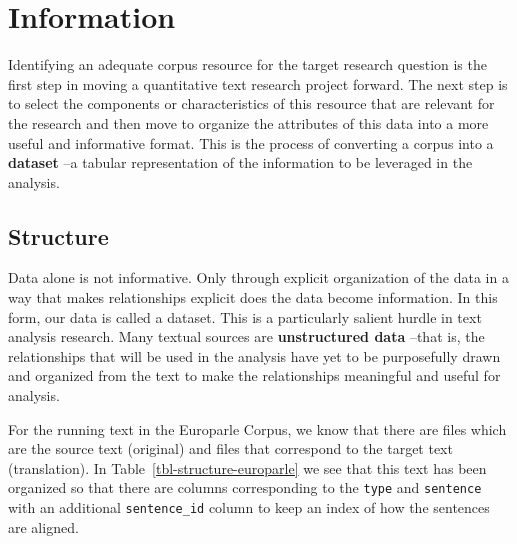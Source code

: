 \documentclass[
  letterpaper,
]{latex/krantz}
\begin{document}
\hypertarget{information}{%
\section{Information}\label{information}}

Identifying an adequate corpus resource for the target research question
is the first step in moving a quantitative text research project
forward. The next step is to select the components or characteristics of
this resource that are relevant for the research and then move to
organize the attributes of this data into a more useful and informative
format. This is the process of converting a corpus into a
\textbf{dataset} --a tabular representation of the
information to be leveraged in the analysis.

\hypertarget{structure-1}{%
\subsection{Structure}\label{structure-1}}

Data alone is not informative. Only through explicit organization of the
data in a way that makes relationships explicit does the data become
information. In this form, our data is called a dataset. This is a
particularly salient hurdle in text analysis research. Many textual
sources are \textbf{unstructured data} --that
is, the relationships that will be used in the analysis have yet to be
purposefully drawn and organized from the text to make the relationships
meaningful and useful for analysis.

For the running text in the Europarle Corpus, we know that there are
files which are the source text (original) and files that correspond to
the target text (translation). In Table~\ref{tbl-structure-europarle} we
see that this text has been organized so that there are columns
corresponding to the \texttt{type} and \texttt{sentence} with an
additional \texttt{sentence\_id} column to keep an index of how the
sentences are aligned.
\end{document}
